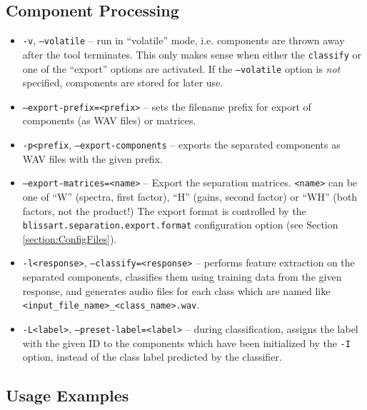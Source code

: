 \subsection{Component Processing}
\begin{itemize}
  \item {\tt -v}, {\tt --volatile} -- run in ``volatile'' mode,
    i.e. components are thrown away after the tool terminates. This only makes
    sense when either the {\tt classify} or one of the ``export'' options are
    activated. If the {\tt --volatile} option is \emph{not}
    specified, components are stored for later use.
  \item {\tt --export-prefix=<prefix>} -- sets the filename prefix for export of
    components (as WAV files) or matrices.
  \item {\tt -p<prefix}, {\tt --export-components} -- exports the separated
    components as WAV files with the given prefix.
  \item {\tt --export-matrices=<name>} -- Export the separation matrices. 
    {\tt <name>} can be one of ``W'' (spectra, first factor), 
    ``H'' (gains, second factor) or ``WH'' (both factors, not the product!)
    The export format is controlled by the {\tt blissart.separation.export.format}
    configuration option (see Section \ref{section:ConfigFiles}).
  \item {\tt -l<response>}, {\tt --classify=<response>} -- performs feature
    extraction on the separated components, classifies them using training
    data from the given response, and generates audio files for each class
    which are named like {\tt <input\_file\_name>\_<class\_name>.wav}.
  \item {\tt -L<label>}, {\tt --preset-label=<label>} -- during classification,
    assigns the label with the given ID to the components which have been 
    initialized by the {\tt -I} option, instead of the class label predicted 
    by the classifier.
\end{itemize}


\subsection{Usage Examples}


